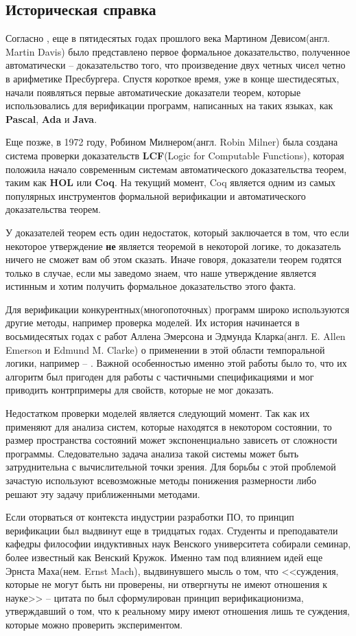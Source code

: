 \subsection{Историческая справка}

Согласно \cite{omodeo2017martin}, еще в пятидесятых годах прошлого века Мартином Девисом(англ. Martin Davis) было представлено первое формальное доказательство, полученное автоматически -- доказательство того, что произведение двух четных чисел четно в арифметике Пресбургера. Спустя короткое время, уже в конце шестидесятых, начали появляться первые автоматические доказатели теорем, которые использовались для верификации программ, написанных на таких языках, как \textbf{Pascal}, \textbf{Ada} и \textbf{Java}.

Еще позже, в 1972 году, Робином Милнером(англ. Robin Milner) была создана система проверки доказательств \textbf{LCF}(Logic for Computable Functions), которая положила начало современным системам автоматического доказательства теорем, таким как \textbf{HOL} или \textbf{Coq}. На текущий момент, Coq является одним из самых популярных инструментов формальной верификации и автоматического доказательства теорем.

У доказателей теорем есть один недостаток, который заключается в том, что если некоторое утверждение \textbf{не} является теоремой в некоторой логике, то доказатель ничего не сможет вам об этом сказать. Иначе говоря, доказатели теорем годятся только в случае, если мы заведомо знаем, что наше утверждение является истинным и хотим получить формальное доказательство этого факта.

Для верификации конкурентных(многопоточных) программ широко используются другие методы, например проверка моделей. Их история начинается в восьмидесятых годах с работ Аллена Эмерсона и Эдмунда Кларка(англ. E. Allen Emerson и Edmund M. Clarke) о применении в этой области темпоральной логики, например -- \cite{Clarke:1981:DSS:648063.747438}. Важной особенностью именно этой работы было то, что их алгоритм был пригоден для работы с частичными спецификациями и мог приводить контрпримеры для свойств, которые не мог доказать.

Недостатком проверки моделей является следующий момент. Так как их применяют для анализа систем, которые находятся в некотором состоянии, то размер пространства состояний может экспоненциально зависеть от сложности программы. Следовательно задача анализа такой системы может быть затруднительна с вычислительной точки зрения. Для борьбы с этой проблемой зачастую используют всевозможные методы понижения размерности либо решают эту задачу приближенными методами.

Если оторваться от контекста индустрии разработки ПО, то принцип верификации был выдвинут еще в тридцатых годах. Студенты и преподаватели кафедры философии индуктивных наук Венского университета собирали семинар, более известный как Венский Кружок. Именно там под влиянием идей еще Эрнста Маха(нем. Ernst Mach), выдвинувшего мысль о том, что <<суждения, которые не могут быть ни проверены, ни отвергнуты не имеют отношения к науке>> -- цитата по \cite{wiki:mach} был сформулирован принцип верификационизма, утверждавший о том, что к реальному миру имеют отношения лишь те суждения, которые можно проверить экспериментом.
